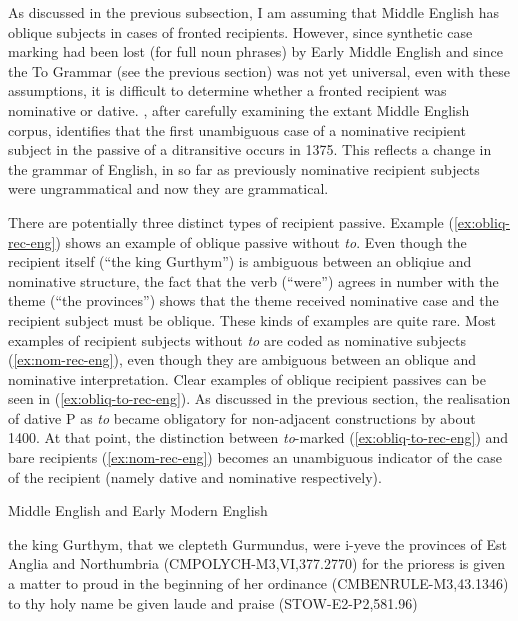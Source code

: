 	As discussed in the previous subsection, I am assuming that Middle English has oblique subjects in cases of fronted recipients. However, since synthetic case marking had been lost (for full noun phrases) by Early Middle English and since the To Grammar (see the previous section) was not yet universal, even with these assumptions, it is difficult to determine whether a fronted recipient was nominative or dative. \cite{Allen.1999}, after carefully examining the extant Middle English corpus, identifies that the first unambiguous case of a nominative recipient subject in the passive of a ditransitive occurs in 1375. This reflects a change in the grammar of English, in so far as previously nominative recipient subjects were ungrammatical and now they are grammatical.

	There are potentially three distinct types of recipient passive. Example (\ref{ex:obliq-rec-eng}) shows an example of oblique passive without \textit{to}. Even though the recipient itself (``the king Gurthym'') is ambiguous between an obliqiue and nominative structure, the fact that the verb (``were'') agrees in number with the theme (``the provinces'') shows that the theme received nominative case and the recipient subject must be oblique. These kinds of examples are quite rare. Most examples of recipient subjects without \textit{to} are coded as nominative subjects (\ref{ex:nom-rec-eng}), even though they are ambiguous between an oblique and nominative interpretation. Clear examples of oblique recipient passives can be seen in (\ref{ex:obliq-to-rec-eng}). As discussed in the previous section, the realisation of dative P as \textit{to} became obligatory for non-adjacent constructions by about 1400. At that point, the distinction between \textit{to}-marked (\ref{ex:obliq-to-rec-eng}) and bare recipients (\ref{ex:nom-rec-eng}) becomes an unambiguous indicator of the case of the recipient (namely dative and nominative respectively).

	\begin{exe}
		\ex Middle English \citep{Kroch.2000} and Early Modern English \citep{Kroch.2004}
		\begin{xlist}
			\ex\label{ex:obliq-rec-eng} the king Gurthym, that we clepteth Gurmundus, were i-yeve the provinces of Est Anglia and Northumbria (CMPOLYCH-M3,VI,377.2770)
			\ex\label{ex:nom-rec-eng} for the prioress is given a matter to proud in the beginning of her ordinance (CMBENRULE-M3,43.1346)
			\ex\label{ex:obliq-to-rec-eng} to thy holy name be given laude and praise (STOW-E2-P2,581.96)
		\end{xlist}
	\end{exe}


